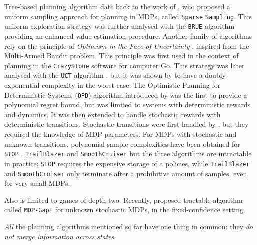 \documentclass[runningheads]{llncs}
\begin{document}
Tree-based planning algorithm date back to the work of \citet{Kearns02SS}, who proposed a uniform sampling approach for planning in MDPs, called \texttt{Sparse} \texttt{Sampling}. This uniform exploration strategy was further analysed with the \texttt{BRUE} algorithm \citep{Feldman14BRUE} providing an enhanced value estimation procedure. Another family of algorithms rely on the principle of \emph{Optimism in the Face of Uncertainty} \citep[surveyed by][]{Munos14}, inspired from the Multi-Armed Bandit problem. This principle was first used in the context of planning in the \texttt{CrazyStone} software \citep{Coulom2006} for computer Go. This strategy was later analysed with the \texttt{UCT} algorithm \citep{Kocsis06UCT}, but it was shown by \citet{Coquelin2007} to have a doubly-exponential complexity in the worst case. The {Optimistic Planning for Deterministic Systems} (\texttt{OPD}) algorithm introduced by \citet{Hren2008optimistic} was the first to provide a polynomial regret bound, but was limited to systems with deterministic rewards and dynamics. It was then extended to handle stochastic rewards \citep{Bubeck2010open,Leurent2019practical} with deterministic transitions.
Stochastic transitions were first handled by \citet{Busoniu2012optimistic}, but they required the knowledge of MDP parameters. For MDPs with stochastic and unknown transitions, polynomial sample complexities have been obtained for \texttt{StOP} \citep{Szorenyi14}, \texttt{TrailBlazer} \citep{Grill16} and \texttt{SmoothCruiser} \citep{Grill19} but the three algorithms are intractable in practice: \texttt{StOP} requires the expensive storage of a policies, while \texttt{TrailBlazer} and \texttt{SmoothCruiser} only terminate after a prohibitive amount of samples, even for very small MDPs. 

Also \citep{Kaufmann2017} is limited to games of depth two.
Recently, \citet{MDPGapE2020} proposed tractable algorithm called \texttt{MDP-GapE} for unknown stochastic MDPs, in the fixed-confidence setting.



\emph{All} the planning algorithms mentioned so far have one thing in common: they \emph{do not merge information across states}.
\end{document}
